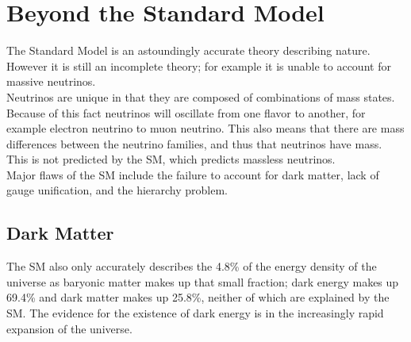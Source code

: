 



\section{Beyond the Standard Model}

The Standard Model is an astoundingly accurate theory describing nature.  However it is still an incomplete theory; for example it is unable to account for massive neutrinos. \\%


Neutrinos are unique in that they are composed of combinations of mass states.  Because of this fact neutrinos will oscillate from one flavor to another, for example electron neutrino to muon neutrino.  This also means that there are mass differences between the neutrino families, and thus that neutrinos have mass.  This is not predicted by the SM, which predicts massless neutrinos. \\

Major flaws of the SM include the failure to account for dark matter, lack of gauge unification, and the hierarchy problem.  \\

\subsection{Dark Matter}

The SM also only accurately describes the 4.8\% of the energy density of the universe as baryonic matter makes up that small fraction; dark energy makes up 69.4\% and dark matter makes up 25.8\%\cite{planckpaper}, neither of which are explained by the SM.  The evidence for the existence of dark energy is in the increasingly rapid expansion of the universe.  \\

